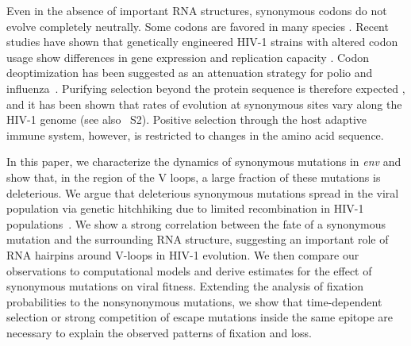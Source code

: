 \documentclass[rmp, twocolumn]{revtex4}
\newcommand{\env}{\textit{env}}
\newcommand{\syndiv}{2}
\begin{document}
Even in the absence of important RNA structures, synonymous codons do not evolve
completely neutrally. Some codons are favored in many species
\citep{plotkin_synonymous_2011}. Recent studies have shown that genetically
engineered HIV-1 strains with altered codon usage show differences in gene
expression and replication capacity \citep{ngumbela_quantitative_2008,
li_codon-usage-based_2012, keating_rich_2009}. Codon deoptimization has been
suggested as an attenuation strategy for polio and
influenza~\citep{mueller_live_2010,coleman_virus_2008}. Purifying selection
beyond the protein sequence is therefore expected
\citep{forsdyke_reciprocal_1995,snoeck_mapping_2011}, and it has been shown that
rates of evolution at synonymous sites vary along the HIV-1 genome
\citep{mayrose_towards_2007} (see also \figurename~S\syndiv). Positive
selection through the host adaptive immune system, however, is restricted to
changes in the amino acid sequence.

In this paper, we characterize the dynamics of synonymous mutations in \env{}
and show that, in the region of the V loops, a large fraction of these mutations
is deleterious. We argue that deleterious synonymous mutations
spread in the viral population via genetic hitchhiking due to limited recombination in HIV-1
populations~\citep{neher_recombination_2010, batorsky_estimate_2011}. We show a
strong correlation between the fate of a synonymous mutation and the surrounding RNA
structure, suggesting an important role of RNA hairpins around V-loops
in HIV-1 evolution. We then compare our observations to computational models and derive
estimates for the effect of synonymous mutations on viral fitness. Extending the
analysis of fixation probabilities to the nonsynonymous mutations, we show that
time-dependent selection or strong competition of escape mutations inside the
same epitope are necessary to explain the observed patterns of fixation and
loss.

\end{document}
